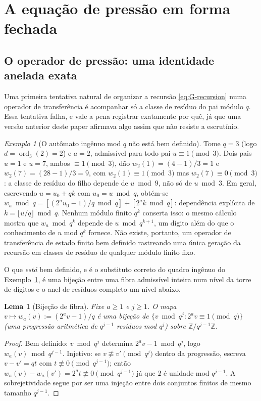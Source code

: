 \documentclass[11pt]{article}
\newtheorem{lemma}[theorem]{Lema}
\theoremstyle{definition}
\theoremstyle{remark}
\newtheorem{example}[theorem]{Exemplo}
\DeclareMathOperator{\OpOrd}{ord}
\begin{document}
\section{A equação de pressão em forma fechada}
\label{sec:pressure}

\subsection{O operador de pressão: uma identidade anelada exata}

Uma primeira tentativa natural de organizar a recursão
\eqref{eq:G-recursion} numa operador de transferência é acompanhar só
a classe de resíduo do pai módulo $q$. Essa tentativa falha, e vale a
pena registrar exatamente por quê, já que uma versão anterior deste
paper afirmava algo assim que não resiste a escrutínio.

\begin{example}[O autômato ingênuo mod $q$ não está bem definido]
\label{ex:naive-fails}
Tome $q=3$ (logo $d=\OpOrd_3(2)=2$) e $a=2$, admissível para todo pai
$u\equiv1\pmod3$. Dois pais $u=1$ e $u=7$, ambos $\equiv1\pmod3$, dão
$w_2(1)=(4-1)/3=1$ e $w_2(7)=(28-1)/3=9$, com $w_2(1)\equiv1\pmod3$
mas $w_2(7)\equiv0\pmod3$: a classe de resíduo do filho depende de
$u\bmod9$, não só de $u\bmod3$. Em geral, escrevendo $u=u_0+qk$ com
$u_0=u\bmod q$, obtém-se $w_a\bmod q = [(2^au_0-1)/q\bmod q] +
[2^ak\bmod q]$: dependência explícita de $k=\lfloor u/q\rfloor\bmod q$.
Nenhum módulo finito $q^k$ conserta isso: o mesmo cálculo mostra que
$w_a\bmod q^k$ depende de $u\bmod q^{k+1}$, um dígito além do que o
conhecimento de $u$ mod $q^k$ fornece. Não existe, portanto, um
operador de transferência de estado finito bem definido rastreando uma
única geração da recursão em classes de resíduo de qualquer módulo
finito fixo.
\end{example}

O que \emph{está} bem definido, e é o substituto correto do quadro
ingênuo do Exemplo~\ref{ex:naive-fails}, é uma bijeção entre uma fibra
admissível inteira num nível da torre de dígitos e o anel de resíduos
completo um nível abaixo.

\begin{lemma}[Bijeção de fibra]\label{lem:fibre-bijection}
Fixe $a\ge1$ e $j\ge1$. O mapa $v\mapsto w_a(v):=(2^av-1)/q$ é uma
bijeção de $\{v\bmod q^j : 2^av\equiv1\!\!\pmod q\}$ (uma progressão
aritmética de $q^{j-1}$ resíduos mod $q^j$) sobre
$\mathbb{Z}/q^{j-1}\mathbb{Z}$.
\end{lemma}
\begin{proof}
Bem definido: $v\bmod q^j$ determina $2^av-1\bmod q^j$, logo
$w_a(v)\bmod q^{j-1}$. Injetivo: se $v\not\equiv v'\pmod{q^j}$ dentro
da progressão, escreva $v-v'=qt$ com $t\not\equiv0\pmod{q^{j-1}}$;
então $w_a(v)-w_a(v')=2^at\not\equiv0\pmod{q^{j-1}}$ já que $2$ é
unidade mod $q^{j-1}$. A sobrejetividade segue por ser uma injeção
entre dois conjuntos finitos de mesmo tamanho $q^{j-1}$.
\end{proof}
\end{document}
